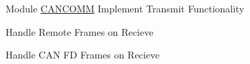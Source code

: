 
\begin{DoxyRefList}
\item[Module \mbox{\hyperlink{group___c_a_n_c_o_m_m}{CANCOMM}} ]\label{todo__todo000001}%
%
Implement Transmit Functionality 



Handle Remote Frames on Recieve 



Handle CAN FD Frames on Recieve 


\end{DoxyRefList}